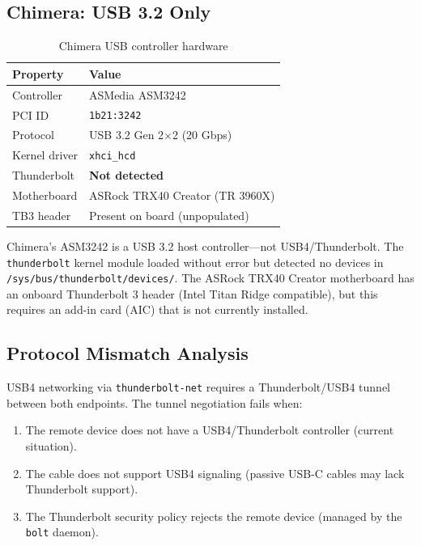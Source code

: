 \documentclass[11pt,letterpaper]{article}
\begin{document}
\subsection{Chimera: USB 3.2 Only}

\begin{table}[htbp]
\centering
\caption{Chimera USB controller hardware}
\label{tab:chimera-usb4}
\begin{tabular}{@{}ll@{}}
\toprule
\textbf{Property} & \textbf{Value} \\
\midrule
Controller & ASMedia ASM3242 \\
PCI ID & \texttt{1b21:3242} \\
Protocol & USB 3.2 Gen 2$\times$2 (20 Gbps) \\
Kernel driver & \texttt{xhci\_hcd} \\
Thunderbolt & \textbf{Not detected} \\
Motherboard & ASRock TRX40 Creator (TR 3960X) \\
TB3 header & Present on board (unpopulated) \\
\bottomrule
\end{tabular}
\end{table}

Chimera's ASM3242 is a USB 3.2 host controller---not USB4/Thunderbolt. The \texttt{thunderbolt} kernel module loaded without error but detected no devices in \texttt{/sys/bus/thunderbolt/devices/}. The ASRock TRX40 Creator motherboard has an onboard Thunderbolt 3 header (Intel Titan Ridge compatible), but this requires an add-in card (AIC) that is not currently installed.

\subsection{Protocol Mismatch Analysis}

USB4 networking via \texttt{thunderbolt-net} requires a Thunderbolt/USB4 tunnel between both endpoints. The tunnel negotiation fails when:

\begin{enumerate}
    \item The remote device does not have a USB4/Thunderbolt controller (current situation).
    \item The cable does not support USB4 signaling (passive USB-C cables may lack Thunderbolt support).
    \item The Thunderbolt security policy rejects the remote device (managed by the \texttt{bolt} daemon).
\end{enumerate}
\end{document}
